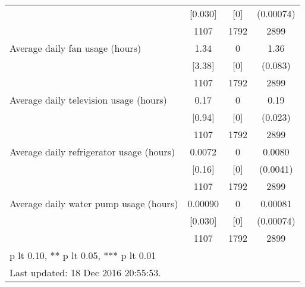 \begin{table}[htbp]
\begin{tabular*}{0.9\hsize}{@{\hskip\tabcolsep\extracolsep\fill}l*{1}{ccc}}
                                &  [0.030]&      [0]&(0.00074)         \\
                                &     1107&     1792&     2899         \\
Average daily fan usage (hours) &     1.34&        0&     1.36\sym{***}\\
                                &   [3.38]&      [0]&  (0.083)         \\
                                &     1107&     1792&     2899         \\
Average daily television usage (hours)&     0.17&        0&     0.19\sym{***}\\
                                &   [0.94]&      [0]&  (0.023)         \\
                                &     1107&     1792&     2899         \\
Average daily refrigerator usage (hours)&   0.0072&        0&   0.0080\sym{**} \\
                                &   [0.16]&      [0]& (0.0041)         \\
                                &     1107&     1792&     2899         \\
Average daily water pump usage (hours)&  0.00090&        0&  0.00081         \\
                                &  [0.030]&      [0]&(0.00074)         \\
                                &     1107&     1792&     2899         \\
\bottomrule
\multicolumn{4}{l}{\footnotesize * p lt 0.10, ** p lt 0.05, *** p lt 0.01}\\
\multicolumn{4}{l}{\footnotesize Last updated: 18 Dec 2016 20:55:53.}\\
\end{tabular*}
\end{table}
